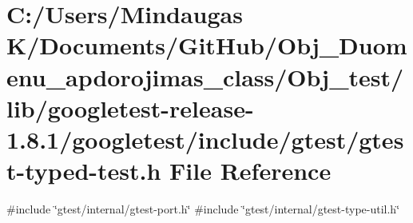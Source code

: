 \hypertarget{_obj__test_2lib_2googletest-release-1_88_81_2googletest_2include_2gtest_2gtest-typed-test_8h}{}\section{C\+:/\+Users/\+Mindaugas K/\+Documents/\+Git\+Hub/\+Obj\+\_\+\+Duomenu\+\_\+apdorojimas\+\_\+class/\+Obj\+\_\+test/lib/googletest-\/release-\/1.8.1/googletest/include/gtest/gtest-\/typed-\/test.h File Reference}
\label{_obj__test_2lib_2googletest-release-1_88_81_2googletest_2include_2gtest_2gtest-typed-test_8h}
{\ttfamily \#include \char`\"{}gtest/internal/gtest-\/port.\+h\char`\"{}}\newline
{\ttfamily \#include \char`\"{}gtest/internal/gtest-\/type-\/util.\+h\char`\"{}}\newline
